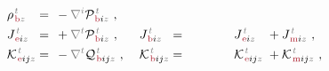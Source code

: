 \begin{subequations}
\begin{align}
	&{\rho}^{\;\!\mathcolor{gray}{t}}_{\;\!\textcolor{Maroon}{\text{b}} \mathcolor{gray}{z}} \hspace{-1em}&&=\hspace{0.2em} &&\hspace{-0.7em}- \mathcolor{gray}{\nabla^i} {\mathcal{P}}^{\;\!\mathcolor{gray}{t}}_{\;\!\textcolor{Maroon}{\text{b}} i \mathcolor{gray}{z}}~, &&\hspace{0.3em} \hspace{-1em}&&\hspace{0.2em} &&\hspace{-0.7em} \label{eq:pb-Jb} \\
	&{J}^{\;\!\mathcolor{gray}{t}}_{\;\!\textcolor{Maroon}{\text{e}} i \mathcolor{gray}{z}} \hspace{-1em}&&=\hspace{0.2em} &&\hspace{-0.7em}+ \mathcolor{gray}{\nabla^t} {\mathcal{P}}^{\;\!\mathcolor{gray}{t}}_{\;\!\textcolor{Maroon}{\text{b}} i \mathcolor{gray}{z}}~, &&\hspace{0.3em} {J}^{\;\!\mathcolor{gray}{t}}_{\;\!\textcolor{Maroon}{\text{b}} i \mathcolor{gray}{z}} \hspace{-1em}&&=\hspace{0.2em} ~ \hphantom{-\frac{1}{2!} \epsilon^{\hphantom{ij}k}_{i\mathcolor{gray}{j}}} {J}^{\;\!\mathcolor{gray}{t}}_{\;\!\textcolor{Maroon}{\text{e}} i \mathcolor{gray}{z}} &&\hspace{-0.7em}+ {J}^{\;\!\mathcolor{gray}{t}}_{\;\!\textcolor{Maroon}{\text{m}} i \mathcolor{gray}{z}}~, \label{eq:Je-Jb} \\
	&{\mathcal{K}}^{\;\!\mathcolor{gray}{t}}_{\;\!\textcolor{Maroon}{\text{e}} ij \mathcolor{gray}{z}} \hspace{-1em}&&=\hspace{0.2em} &&\hspace{-0.7em}- \mathcolor{gray}{\nabla^t} {\mathcal{Q}}^{\;\!\mathcolor{gray}{t}}_{\;\!\textcolor{Maroon}{\text{b}} ij \mathcolor{gray}{z}}~, &&\hspace{0.3em} {\mathcal{K}}^{\;\!\mathcolor{gray}{t}}_{\;\!\textcolor{Maroon}{\text{b}} ij \mathcolor{gray}{z}} \hspace{-1em}&&=\hspace{0.2em} ~ \hphantom{-\frac{1}{2!} \epsilon^{\hphantom{ij}k}_{i\mathcolor{gray}{j}}} {\mathcal{K}}^{\;\!\mathcolor{gray}{t}}_{\;\!\textcolor{Maroon}{\text{e}} ij \mathcolor{gray}{z}} &&\hspace{-0.7em}+ {\mathcal{K}}^{\;\!\mathcolor{gray}{t}}_{\;\!\textcolor{Maroon}{\text{m}} ij \mathcolor{gray}{z}}~, \label{eq:Ke-Kb} \\

\end{align}
\end{subequations}
